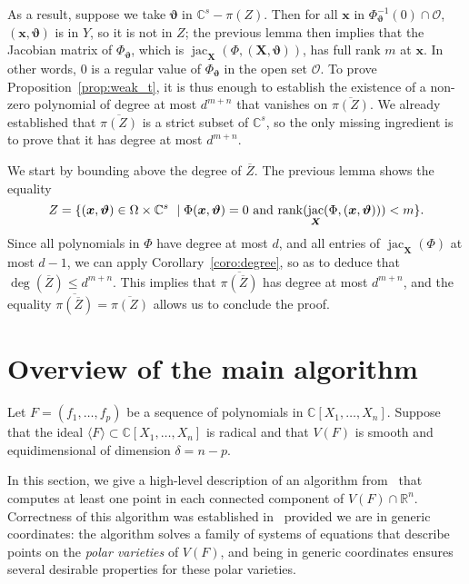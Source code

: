 \documentclass[12pt]{article}
\def\sO{\mathscr{O}}
\def\thetab{\bm{\vartheta}}
\def\xb{{\bm x}}
\DeclareMathOperator{\jac}{jac}
\def\dt{s}
\def\C{\mathbb{C}}
\def\R{\mathbb{R}}
\begin{document}
As a result, suppose we take $\thetab$ in $\C^\dt - {\pi(Z)}$.  Then
for all $\xb$ in $\Phi_{\thetab}^{-1}(0) \cap \sO$, $(\xb,\thetab)$ is
in $Y$, so it is not in $Z$; the previous lemma then implies that the
Jacobian matrix of $\Phi_{\thetab}$, which is $\jac_{\bm X}(\Phi,(\bm
X,\thetab))$, has full rank $m$ at $\xb$. In other words, $0$ is a
regular value of $\Phi_{\thetab}$ in the open set $\sO$. To prove
Proposition~\ref{prop:weak_t}, it is thus enough to establish the
existence of a non-zero polynomial of degree at most $d^{m+n}$ that
vanishes on $\overline{\pi(Z)}$. We already established that
$\overline{\pi(Z)}$ is a strict subset of $\C^\dt$, so the only
missing ingredient is to prove that it has degree at most $d^{m+n}$.

We start by bounding above the degree of $\overline{Z}$.
The previous lemma shows the equality
\[Z = \{ (\xb,\thetab) \in \Omega \times \C^\dt \ \mid \Phi(\xb,\thetab) =0
\text{~and~} {\rm rank}(\jac_{\bm X}(\Phi,(\xb,\thetab))) < m\}.\]
Since all polynomials in $\Phi$ have degree at most $d$, and all
entries of $\jac_{\bm X}(\Phi)$ at most $d-1$, we can apply
Corollary~\ref{coro:degree}, so as to deduce that $\deg(\overline{Z})
\le d^{m+n}$. This implies that $\overline{\pi(\overline Z)}$ has
degree at most $d^{m+n}$, and the equality $\overline{\pi(\overline
  Z)} =\overline{\pi(Z)}$ allows us to conclude the proof.


\section{Overview of the main algorithm}\label{sec:overview}

Let $F = (f_1,\hdots,f_p)$ be a sequence of polynomials in
$\C[X_1,\hdots,X_n]$. Suppose that the ideal $\langle F \rangle
\subset \C[X_1,\hdots,X_n]$ is radical and that $V(F)$ is smooth and
equidimensional of dimension $\delta= n-p$.

In this section, we give a high-level description of an algorithm
from~\cite{EMP} that computes at least one point in each connected
component of $V(F) \cap \R^n$. Correctness of this algorithm was
established in~\cite{EMP} provided we are in generic coordinates: the
algorithm solves a family of systems of equations that describe points
on the {\em polar varieties} of $V(F)$, and being in generic
coordinates ensures several desirable properties for these polar
varieties.
\end{document}
